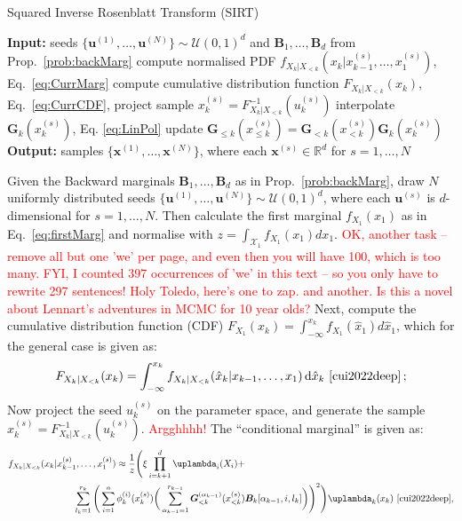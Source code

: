 \begin{algorithm}[!th]
	\caption{Squared Inverse Rosenblatt Transform (SIRT)}
	\begin{algorithmic}[1]
		\STATE \textbf{Input:} seeds $\{ \bm{u}^{(1)},\dots, \bm{u}^{(N)} \} \sim \mathcal{U}(0,1)^d $ and $\bm{B}_1 , \dots,\bm{B}_d$  from Prop.~\ref{prob:backMarg}
		\STATE compute normalised PDF $ f_{X_k|X_{<k}}(x_k|x^{(s)}_{k-1},\dots,x^{(s)}_1)$, Eq.~\ref{eq:CurrMarg}
		\STATE compute cumulative distribution function $F_{X_k|X_{<k}}(x_k)$, Eq.~\ref{eq:CurrCDF},
		\STATE project sample $x^{(s)}_k = F_{X_k|X_{<k}}^{-1}(u^{(s)}_k)$
		\STATE interpolate $\bm{G}_k(x^{(s)}_k)$, Eq. \ref{eq:LinPol}
		\STATE update $\bm{G}_{\leq k}(x^{(s)}_{\leq k}) = \bm{G}_{<k}(x^{(s)}_{<k}) \bm{G}_k(x^{(s)}_k)$
		\ENDFOR
		\ENDFOR
		\STATE \textbf{Output:} samples $\{ \bm{x}^{(1)},\dots, \bm{x}^{(N)} \} $, where each $\bm{x}^{(s)} \in \mathbb{R}^d$ for $s = 1, \dots, N$
	\end{algorithmic}
	\label{alg:SIRT}
\end{algorithm}
Given the Backward marginals $\bm{B}_1 , \dots,\bm{B}_d$ as in Prop.~\ref{prob:backMarg}, draw $N$ uniformly distributed seeds $\{ \bm{u}^{(1)},\dots, \bm{u}^{(N)} \} \sim \mathcal{U}(0,1)^d $, where each $\bm{u}^{(s)}$ is $d$-dimensional for $s = 1, \dots, N$.
Then calculate the first marginal $f_{X_1}(x_1)$ as in Eq.~\ref{eq:firstMarg} and normalise with $z = \int_{\mathcal{X}_1} f_{X_1}(x_1) d x_1$. \textcolor{red}{OK, another task -- remove all but one 'we' per page, and even then you will have 100, which is too many. FYI, I counted 397 occurrences of 'we' in this text -- so you only have to rewrite 297 sentences! Holy Toledo, here's one to zap. and another. Is this a novel about Lennart's adventures in MCMC for 10 year olds?}
Next, compute the cumulative distribution function (CDF) $F_{X_1}(x_k) = \int^{x_k}_{-\infty} f_{X_1}(\hat{x}_1) d \hat{x}_1$, which for the general case is given as:
\begin{align}
	F_{X_k|X_{<k}}(x_k) = \int_{-\infty}^{x_k} f_{X_k|X_{<k}}(\hat{x}_k|x_{k-1},\dots,x_1) \diff \hat{x}_k  \, \, \text{\cite[Eq. 17]{cui2022deep}} \, ;
	\label{eq:CurrCDF}
\end{align}
Now project the seed $u^{(s)}_k$ on the parameter space, and generate the sample $x^{(s)}_k = F_{X_k|X_{<k}}^{-1}(u^{(s)}_k)$. \textcolor{red}{Argghhhh!}
The ``conditional marginal'' is given as:
\begin{align}\begin{split} 
		f_{X_k|X_{<k}}(x_k|x^{(s)}_{k-1},\dots,x^{(s)}_1) \approx \frac{1}{z}
		\Bigg( 
		\xi \prod_{i=k+1}^{d} \uplambda_i(X_i) +&  \\
		\sum_{l_{k} = 1}^{r_{k}} \Bigg( \sum_{i = 1}^{n}  \phi^{(i)}_k(x^{(s)}_k) \bigg( \sum_{\alpha_{k-1} = 1}^{r_{k-1}} \bm{G}^{(\alpha_{k-1})}_{<k}(x^{(s)}_{<k}) &\bm{B}_k[\alpha_{k-1},i,l_k] \bigg) \Bigg)^2 \Bigg) \uplambda_k(x_k) \, \,  \text{\cite[Eq. 31]{cui2022deep}},
	\end{split} 
	\label{eq:CurrMarg} 
\end{align}
